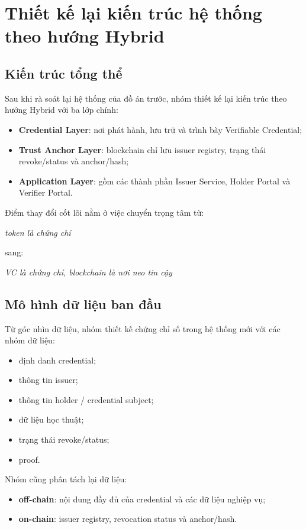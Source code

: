 \section{Thiết kế lại kiến trúc hệ thống theo hướng Hybrid}

\subsection{Kiến trúc tổng thể}

Sau khi rà soát lại hệ thống của đồ án trước, nhóm thiết kế lại kiến trúc theo hướng Hybrid với ba lớp chính:

\begin{itemize}
    \item \textbf{Credential Layer}: nơi phát hành, lưu trữ và trình bày Verifiable Credential;
    \item \textbf{Trust Anchor Layer}: blockchain chỉ lưu issuer registry, trạng thái revoke/status và anchor/hash;
    \item \textbf{Application Layer}: gồm các thành phần Issuer Service, Holder Portal và Verifier Portal.
\end{itemize}

Điểm thay đổi cốt lõi nằm ở việc chuyển trọng tâm từ:
\begin{center}
\textit{token là chứng chỉ}
\end{center}
sang:
\begin{center}
\textit{VC là chứng chỉ, blockchain là nơi neo tin cậy}
\end{center}

\subsection{Mô hình dữ liệu ban đầu}

Từ góc nhìn dữ liệu, nhóm thiết kế chứng chỉ số trong hệ thống mới với các nhóm dữ liệu:
\begin{itemize}
    \item định danh credential;
    \item thông tin issuer;
    \item thông tin holder / credential subject;
    \item dữ liệu học thuật;
    \item trạng thái revoke/status;
    \item proof.
\end{itemize}

Nhóm cũng phân tách lại dữ liệu:
\begin{itemize}
    \item \textbf{off-chain}: nội dung đầy đủ của credential và các dữ liệu nghiệp vụ;
    \item \textbf{on-chain}: issuer registry, revocation status và anchor/hash.
\end{itemize}

